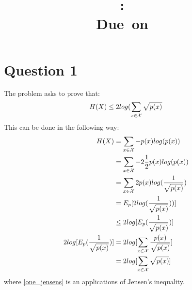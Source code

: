 \documentclass{article}
\title{
\vspace{2in}
\textmd{\textbf{\hmwkClass:\ \hmwkTitle}}\\
\normalsize\vspace{0.1in}\small{Due\ on\ \hmwkDueDate}\\
\vspace{0.1in}\large{\textit{\hmwkClassInstructor}}
\vspace{3in}
}
\author{\textbf{\hmwkAuthorName}}
\date{} %
\begin{document}
\maketitle
\newpage




%



\section{Question 1}
The problem asks to prove that:
\begin{equation*}
H(X) \leq 2log(\sum_{x \in  \mathcal{X}{}} \sqrt{p(x)}
\end{equation*}
This can be done in the following way:
\begin{align}
H(X) & = \sum_{x \in  \mathcal{X}} -p(x)log(p(x))\\
& =  \sum_{x \in  \mathcal{X}} -2\frac{1}{2}p(x)log(p(x))\\
& =  \sum_{x \in  \mathcal{X}} 2p(x)log(\frac{1}{\sqrt{p(x)} })\\
& =  E_{p} [2 log(\frac{1}{ \sqrt{p(x)} })) ]\\
& \leq  2 log[ E_{p} (\frac{1}{ \sqrt{p(x)} }) ]\label{one_jensens}\\
2 log[ E_{p} (\frac{1}{ \sqrt{p(x)} }) ] & =  2 log[ \sum_{x \in  \mathcal{X}} \frac{p(x)}{ \sqrt{p(x)} } ]\\
& =  2 log[ \sum_{x \in  \mathcal{X}} \sqrt{p(x)} ]
\end{align}
where \ref{one_jensens} is an applications of Jensen's inequality. \QED

\newpage
\end{document}
